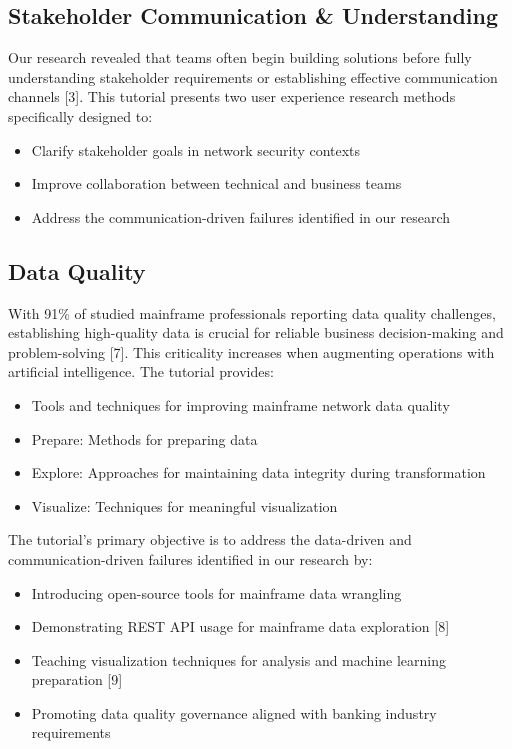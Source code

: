 \documentclass[a4paper]{article}
\begin{document}
\subsection{Stakeholder Communication \& Understanding}
    Our research revealed that teams often begin building solutions before fully understanding stakeholder requirements or establishing effective communication channels [3]. This tutorial presents two user experience research methods specifically designed to:
    \begin{itemize}
        \item Clarify stakeholder goals in network security contexts
        \item Improve collaboration between technical and business teams
        \item Address the communication-driven failures identified in our research
    \end{itemize}

\subsection{Data Quality}
    With 91\% of studied mainframe professionals reporting data quality challenges, establishing high-quality data is crucial for reliable business decision-making and problem-solving [7]. This criticality increases when augmenting operations with artificial intelligence. The tutorial provides:
    
    \begin{itemize}
        \item Tools and techniques for improving mainframe network data quality
        \item Prepare: Methods for preparing data
        \item Explore: Approaches for maintaining data integrity during transformation
        \item Visualize: Techniques for meaningful visualization
    \end{itemize}
    
    The tutorial's primary objective is to address the data-driven and communication-driven failures identified in our research by:
    
    \begin{itemize}
        \item Introducing open-source tools for mainframe data wrangling
        \item Demonstrating REST API usage for mainframe data exploration [8]
        \item Teaching visualization techniques for analysis and machine learning preparation [9]
        \item Promoting data quality governance aligned with banking industry requirements
    \end{itemize}
\end{document}
